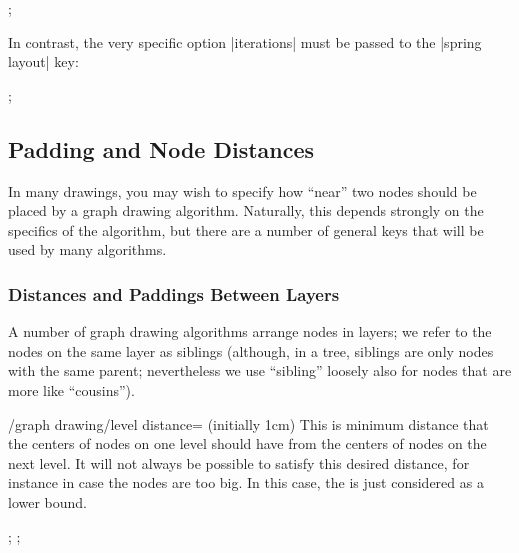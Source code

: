 {\begin{codeexample}[]
\tikz {};  
\end{codeexample}

In contrast, the very specific option |iterations| must be
passed to the |spring layout| key:

\begin{codeexample}[]
\tikz {};  
\end{codeexample}





\subsection{Padding and Node Distances}

\label{subsection-gd-dist-pad}

In many drawings, you may wish to specify how ``near'' two nodes should
be placed by a graph drawing algorithm. Naturally, this depends
strongly on the specifics of the algorithm, but there are a number of
general keys that will be used by many algorithms.



\subsubsection{Distances and Paddings Between Layers}

A number of graph drawing algorithms arrange nodes in layers; we refer
to the nodes on the same layer as siblings (although, in a tree,
siblings are only nodes with the same parent; nevertheless we use
``sibling'' loosely also for nodes that are more like ``cousins'').

\begin{key}{/graph drawing/level distance= (initially 1cm)}
  This is minimum distance that the centers of nodes on one
  level should have from the centers of nodes on the next level. It
  will not always be possible to satisfy this desired distance, for
  instance in case the nodes are too big. In this case, the
   is just considered as a lower bound.
\begin{codeexample}[]
\tikz {};  
\tikz {};  
\end{codeexample}
\end{key}

}
